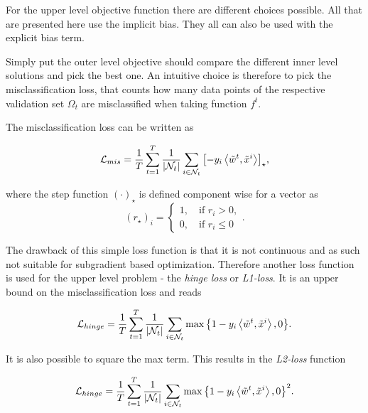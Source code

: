 For the upper level objective function there are different choices possible. All that are presented here use the implicit bias. They all can also be used with the explicit bias term.

Simply put the outer level objective should compare the different inner level solutions and pick the best one. An intuitive choice is therefore to pick the misclassification loss, that counts how many data points of the respective validation set \(\Omega_t\) are misclassified when taking function \(f^t\).

The misclassification loss can be written as

\begin{equation}
	\mathcal{L}_{mis} = \frac{1}{T}\sum_{t=1}^T\frac{1}{|\mathcal{N}_t|}\sum_{i \in \mathcal{N}_t}{\left[-y_i\left\langle \tilde{w}^t,\tilde{x}^i\right\rangle\right]_{\star}},
\label{misclass_loss}
\end{equation}

where the step function \((\cdot)_{\star}\) is defined component wise for a vector as
\begin{equation}
	(r_{\star})_i = \left\{\begin{array}{c} 1, \quad \text{if } r_i > 0, \\ 0, \quad \text{if } r_i \leq 0 \end{array} \right. .
\label{step_fun}
\end{equation}

The drawback of this simple loss function is that it is not continuous and as such not suitable for subgradient based optimization. Therefore another loss function is used for the upper level problem - the \emph{hinge loss} or \emph{L1-loss}. It is an upper bound on the misclassification loss and reads

\begin{equation}
		\mathcal{L}_{hinge} = \frac{1}{T}\sum_{t=1}^T\frac{1}{|\mathcal{N}_t|}\sum_{i \in \mathcal{N}_t}{\max\left\{1-y_i\left\langle \tilde{w}^t,\tilde{x}^i\right\rangle,0\right\}}.
\label{hinge_loss}
\end{equation}

It is also possible to square the max term. This results in the \emph{L2-loss} function

\begin{equation}
		\mathcal{L}_{hinge} = \frac{1}{T}\sum_{t=1}^T\frac{1}{|\mathcal{N}_t|}\sum_{i \in \mathcal{N}_t}{\max\left\{1-y_i\left\langle \tilde{w}^t,\tilde{x}^i\right\rangle,0\right\}^2}.
\label{hingequad_loss}
\end{equation}

